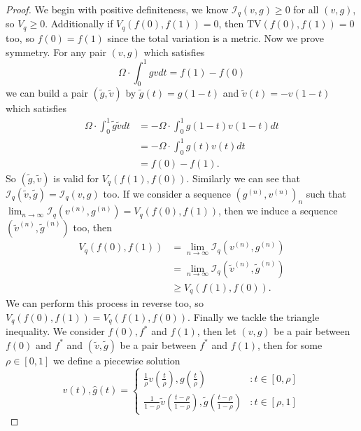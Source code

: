 \documentclass[conference]{IEEEtran}
\theoremstyle{ieeestyle}
\begin{document}
\begin{proof}
    We begin with positive definiteness, we know $\mathcal{I}_q(v,g) \geq 0$ for all $(v,g)$, so $V_q \geq 0$. Additionally if $V_q(f(0),f(1)) = 0$, then $\text{TV}(f(0),f(1)) = 0$ too, so $f(0) = f(1)$ since the total variation is a metric. Now we prove symmetry. For any pair $(v,g)$ which satisfies
    \begin{equation*}
        \Omega \cdot \int_0^1 gv dt = f(1) - f(0)
    \end{equation*}
    we can build a pair $(\tilde{g},\tilde{v})$ by $\tilde{g}(t) = g(1-t)$ and $\tilde{v}(t) = -v(1-t)$ which satisfies \begin{align*}
        \Omega \cdot \int_0^1 \tilde{g}\tilde{v} dt &= -\Omega \cdot \int_0^1 g(1-t)v(1-t) dt \\
        &= -\Omega \cdot \int_0^1 g(t)v(t) dt \\
        &= f(0) - f(1).
    \end{align*}
    So $(\tilde{g},\tilde{v})$ is valid for $V_q(f(1),f(0))$. Similarly we can see that $\mathcal{I}_q(\tilde{v},\tilde{g}) = \mathcal{I}_q(v,g)$ too. If we consider a sequence $(g^{(n)},v^{(n)})_n$ such that $\lim_{n \rightarrow \infty} \mathcal{I}_q(v^{(n)},g^{(n)}) = V_q(f(0),f(1))$, then we induce a sequence $(\tilde{v}^{(n)},\tilde{g}^{(n)})$ too, then
    \begin{align*}
        V_q(f(0),f(1)) &= \lim_{n \rightarrow \infty}\mathcal{I}_q(v^{(n)},g^{(n)})\\
        &=\lim_{n \rightarrow \infty} \mathcal{I}_q(\tilde{v}^{(n)},\tilde{g}^{(n)}) \\
        &\geq V_q(f(1),f(0)).
    \end{align*}
    We can perform this process in reverse too, so $V_q(f(0),f(1)) = V_q(f(1),f(0))$. Finally we tackle the triangle inequality. We consider $f(0),f^*$ and $f(1)$, then let $(v,g)$ be a pair between $f(0)$ and $f^*$ and $(\tilde{v},\tilde{g})$ be a pair between $f^*$ and $f(1)$, then for some $\rho \in [0,1]$ we define a piecewise solution
    \begin{equation*}
    \hat{v}(t),\hat{g}(t) = 
        \begin{cases}
            \frac{1}{\rho}v\left(\frac{t}{\rho}\right),g\left(\frac{t}{\rho}\right) &: t \in [0,\rho] \\
            \frac{1}{1-\rho}\tilde{v}\left(\frac{t- \rho}{1- \rho} \right),\tilde{g}\left(\frac{t-\rho}{1-\rho}\right) &: t \in [\rho,1]
        \end{cases}

\end{equation*}
\end{proof}
\end{document}
